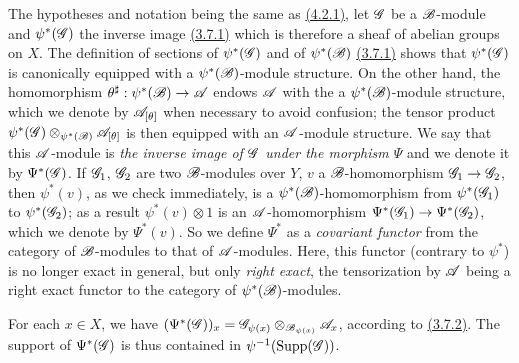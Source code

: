 \begin{env}[4.3.1]
\label{env-0.4.3.1}
The hypotheses and notation being the same as \hyperref[env-0.4.2.1]{(4.2.1)}, let $\mathscr{G}$ be
a $\mathscr{B}$-module and $\psi^*(\mathscr{G})$ the inverse image \hyperref[env-0.3.7.1]{(3.7.1)} which
is therefore a sheaf of abelian groups on $X$. The definition of sections of
$\psi^*(\mathscr{G})$ and of $\psi^*(\mathscr{B})$ \hyperref[env-0.3.7.1]{(3.7.1)} shows that
$\psi^*(\mathscr{G})$ is canonically equipped with a $\psi^*(\mathscr{B})$-module
structure. On the other hand, the homomorphism
$\theta^\sharp:\psi^*(\mathscr{B})\to\mathscr{A}$ endows $\mathscr{A}$ with the a
$\psi^*(\mathscr{B})$-module structure, which we denote by $\mathscr{A}_{[\theta]}$ when
necessary to avoid confusion; the tensor product
$\psi^*(\mathscr{G})\otimes_{\psi^*(\mathscr{B})}\mathscr{A}_{[\theta]}$ is then equipped with
an $\mathscr{A}$-module structure. We say that this $\mathscr{A}$-module is {\em the
inverse image of $\mathscr{G}$ under the morphism $\Psi$}
and we denote it by $\Psi^*(\mathscr{G})$. If $\mathscr{G}_1$, $\mathscr{G}_2$ are two
$\mathscr{B}$-modules over $Y$, $v$ a $\mathscr{B}$-homomorphism $\mathscr{G}_1\to\mathscr{G}_2$,
then $\psi^*(v)$, as we check immediately, is a $\psi^*(\mathscr{B})$-homomorphism
from $\psi^*(\mathscr{G}_1)$ to $\psi^*(\mathscr{G}_2)$; as a result $\psi^*(v)\otimes 1$
is an $\mathscr{A}$-homomorphism $\Psi^*(\mathscr{G}_1)\to\Psi^*(\mathscr{G}_2)$, which we
denote by $\Psi^*(v)$. So we define $\Psi^*$ as a {\em covariant functor} from
the category of $\mathscr{B}$-modules to that of $\mathscr{A}$-modules. Here, this functor
(contrary to $\psi^*$) is no longer exact in general, but only {\em right
exact}, the tensorization by $\mathscr{A}$ being a right exact functor to the
category of $\psi^*(\mathscr{B})$-modules.

For each $x\in X$, we have
$(\Psi^*(\mathscr{G}))_x=\mathscr{G}_{\psi(x)}\otimes_{\mathscr{B}_{\psi(x)}}\mathscr{A}_x$,
according to \hyperref[env-0.3.7.2]{(3.7.2)}. The support of $\Psi^*(\mathscr{G})$ is thus
contained in $\psi^{-1}({\mathop{\mathrm{Supp}}\nolimits}(\mathscr{G}))$.
\end{env}

